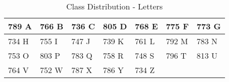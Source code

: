 \begin{table}[ht!]
    \centering
    \begin{tabular}{|l|l|l|l|l|l|l|}
         \hline
            789 A  &  766 B  &   736 C  &   805 D  &  768 E   &  775 F  &   773 G \\ \hline
            734 H  &  755 I  &   747 J  &   739 K  &  761 L   &  792 M  &   783 N \\ \hline
            753 O  &  803 P  &   783 Q  &   758 R  &  748 S   &  796 T  &   813 U \\ \hline
            764 V  &  752 W  &   787 X  &   786 Y  &  734 Z   &         &         \\ \hline
    \end{tabular}
    \caption{Class Distribution - Letters}
\end{table}
